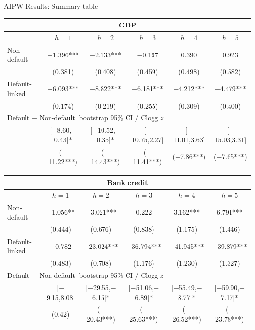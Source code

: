 \documentclass[aspectratio=169]{beamer}
\begin{document}
\begin{frame}{ AIPW Results: Summary table}
  \tiny
  \begin{center}
  \renewcommand{\arraystretch}{1.0}
  \begin{tabular*}{0.92\linewidth}{@{\extracolsep{\fill}}lccccc}
  \multicolumn{6}{c}{\normalsize GDP} \\
  \toprule
   & $h=1$ & $h=2$ & $h=3$ & $h=4$ & $h=5$ \\
  \midrule
  Non-default & $-$1.396*** & $-$2.133*** & $-$0.197 & 0.390 & 0.923 \\
   & (0.381) & (0.408) & (0.459) & (0.498) & (0.582) \\[1pt]
  Default-linked & $-$6.093*** & $-$8.822*** & $-$6.181*** & $-$4.212*** & $-$4.479*** \\
   & (0.174) & (0.219) & (0.255) & (0.309) & (0.400) \\
  \midrule
  \multicolumn{6}{l}{Default $-$ Non-default, bootstrap 95\% CI / Clogg $z$} \\
  & [$-$8.60,$-$0.43]* & [$-$10.52,$-$0.35]* & [$-$10.75,2.27] & [$-$11.01,3.63] & [$-$15.03,3.31] \\
  & ($-$11.22***) & ($-$14.43***) & ($-$11.41***) & ($-$7.86***) & ($-$7.65***) \\
  \bottomrule
  \end{tabular*}
  \vspace{0.5em}
  \begin{tabular*}{0.92\linewidth}{@{\extracolsep{\fill}}lccccc}
  \multicolumn{6}{c}{\normalsize Bank credit} \\
  \toprule
   & $h=1$ & $h=2$ & $h=3$ & $h=4$ & $h=5$ \\
  \midrule
  Non-default & $-$1.056** & $-$3.021*** & 0.222 & 3.162*** & 6.791*** \\
   & (0.444) & (0.676) & (0.838) & (1.175) & (1.446) \\[1pt]
  Default-linked & $-$0.782 & $-$23.024*** & $-$36.794*** & $-$41.945*** & $-$39.879*** \\
   & (0.483) & (0.708) & (1.176) & (1.230) & (1.327) \\
  \midrule
  \multicolumn{6}{l}{Default $-$ Non-default, bootstrap 95\% CI / Clogg $z$} \\
  & [$-$9.15,8.08] & [$-$29.55,$-$6.15]* & [$-$51.06,$-$6.89]* & [$-$55.49,$-$8.77]* & [$-$59.90,$-$7.17]* \\
  & (0.42) & ($-$20.43***) & ($-$25.63***) & ($-$26.52***) & ($-$23.78***) \\
  \bottomrule
  \end{tabular*}
  \end{center}
\end{frame}
\end{document}
